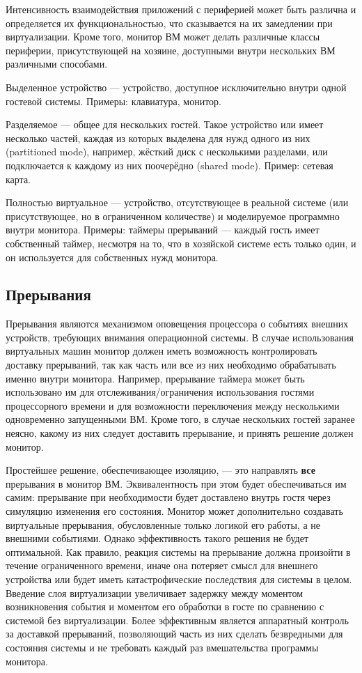 Интенсивность взаимодействия приложений с периферией может быть различна и определяется их функциональностью, что сказывается на их замедлении при виртуализации. Кроме того, монитор ВМ может делать различные классы периферии, присутствующей на хозяине, доступными внутри нескольких ВМ различными способами.

\begin{description*}
    \item[Выделенное устройство] — устройство, доступное исключительно внутри одной гостевой системы. Примеры: клавиатура, монитор.
    \item[Разделяемое] — общее для нескольких гостей. Такое устройство или имеет несколько частей, каждая из которых  выделена для нужд одного из них (\abbr partitioned mode), например, жёсткий диск с несколькими разделами, или подключается к каждому из них поочерёдно (\abbr shared mode). Пример: сетевая карта.
    \item[Полностью виртуальное] — устройство, отсутствующее в реальной системе (или присутствующее, но в ограниченном количестве) и моделируемое программно внутри монитора. Примеры: таймеры прерываний — каждый гость имеет собственный таймер, несмотря на то, что в хозяйской системе есть только один, и он используется для собственных нужд монитора.
\end{description*}


\subsection{Прерывания}

Прерывания являются механизмом оповещения процессора о событиях внешних устройств, требующих внимания операционной системы. В случае использования виртуальных машин монитор должен иметь возможность контролировать доставку прерываний, так как часть или все из них необходимо обрабатывать именно внутри монитора. Например, прерывание таймера может быть использовано им для отслеживания/ограничения использования гостями процессорного времени и для возможности переключения между несколькими одновременно запущенными ВМ. Кроме того, в случае нескольких гостей заранее неясно, какому из них следует доставить прерывание, и принять решение должен монитор.

Простейшее решение, обеспечивающее изоляцию, — это направлять \textbf{все} прерывания в монитор ВМ. Эквивалентность при этом будет обеспечиваться им самим: прерывание при необходимости будет доставлено внутрь гостя через симуляцию изменения его состояния. Монитор может дополнительно создавать виртуальные прерывания, обусловленные только логикой его работы, а не внешними событиями. Однако эффективность такого решения не будет оптимальной. Как правило, реакция системы на прерывание должна произойти в течение ограниченного времени, иначе она потеряет смысл для внешнего устройства или будет иметь катастрофические последствия для системы в целом. Введение слоя виртуализации увеличивает задержку между моментом  возникновения события и моментом его обработки в госте по сравнению с системой без виртуализации. Более эффективным является аппаратный контроль за доставкой прерываний, позволяющий часть из них сделать безвредными для состояния системы и не требовать каждый раз вмешательства программы монитора.

